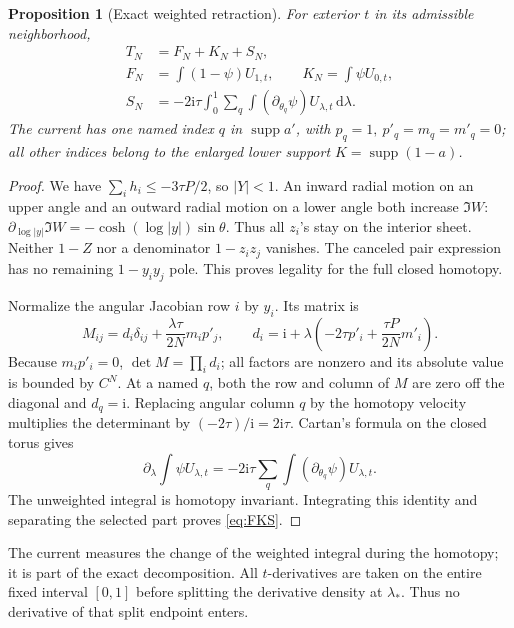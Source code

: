 \documentclass[11pt]{article}
\numberwithin{equation}{section}
\newtheorem{proposition}[theorem]{Proposition}
\theoremstyle{definition}
\newcommand{\dd}{\,\mathrm d}
\newcommand{\ii}{\mathrm i}
\begin{document}
\begin{proposition}[Exact weighted retraction]\label{prop:selector}
For exterior \(t\) in its admissible neighborhood,
\begin{align}
 T_N&=F_N+K_N+S_N,\label{eq:FKS}\\
 F_N&=\int(1-\psi)U_{1,t},\qquad K_N=\int\psi U_{0,t},\nonumber\\
 S_N&=-2\ii\tau\int_0^1\sum_q\int
                         (\partial_{\theta_q}\psi)U_{\lambda,t}\dd\lambda.
 \label{eq:current}
\end{align}
The current has one named index \(q\) in \(\operatorname{supp}a'\),
with \(p_q=1,\ p'_q=m_q=m'_q=0\); all other indices belong to
the enlarged lower support \(K=\operatorname{supp}(1-a)\).
\end{proposition}
\begin{proof}
We have \(\sum_i h_i\le-3\tau P/2\), so \(|Y|<1\).
An inward radial motion on an upper angle and an outward radial motion
on a lower angle both increase \(\Im W\):
\(\partial_{\log|y|}\Im W=-\cosh(\log|y|)\sin\theta\).
Thus all \(z_i\)'s stay on the interior sheet. Neither \(1-Z\)
nor a denominator \(1-z_iz_j\) vanishes. The canceled pair expression
has no remaining \(1-y_iy_j\) pole. This proves legality for the full
closed homotopy.

Normalize the angular Jacobian row \(i\) by \(y_i\). Its matrix is
\[
 M_{ij}=d_i\delta_{ij}+\frac{\lambda\tau}{2N}m_i p'_j,\qquad
 d_i=\ii+\lambda\left(-2\tau p'_i+\frac{\tau P}{2N}m'_i\right).
\]
Because \(m_ip'_i=0\), \(\det M=\prod_i d_i\); all factors are
nonzero and its absolute value is bounded by \(C^N\).
At a named \(q\), both the row and column of \(M\) are zero
off the diagonal and \(d_q=\ii\). Replacing angular column \(q\)
by the homotopy velocity multiplies the determinant by
\((-2\tau)/\ii=2\ii\tau\).
Cartan's formula on the closed torus gives
\[
 \partial_\lambda\int\psi U_{\lambda,t}
 =-2\ii\tau\sum_q\int(\partial_{\theta_q}\psi)U_{\lambda,t}.
\]
The unweighted integral is homotopy invariant. Integrating this identity
and separating the selected part proves \eqref{eq:FKS}.
\end{proof}

The current measures the change of the weighted integral during the
homotopy; it is part of the exact decomposition. All \(t\)-derivatives
are taken on the entire fixed interval
\([0,1]\) before splitting the derivative density at \(\lambda_*\).
Thus no derivative of that split endpoint enters.
\end{document}

